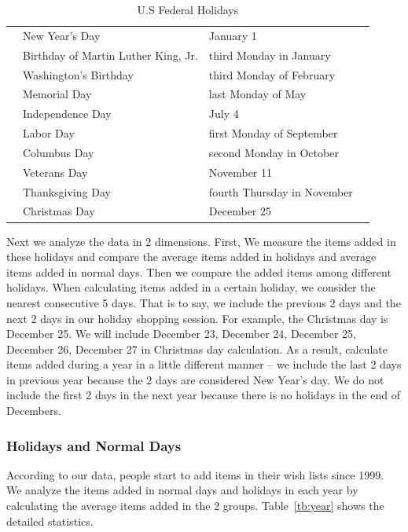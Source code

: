 \documentclass{llncs}
\begin{document}
\begin{table}[!ht]
\centering
\caption{U.S Federal Holidays}
\label{tb:holiday}
\begin{tabular}{p{2cm}p{6cm}p{6cm}p{2cm}}
& New Year's Day & January 1 & \\
& Birthday of Martin Luther King, Jr. & third Monday in January & \\
& Washington's Birthday & third Monday of February & \\
& Memorial Day & last Monday of May & \\
& Independence Day & July 4 & \\
& Labor Day & first Monday of September & \\
& Columbus Day & second Monday in October & \\
& Veterans Day & November 11 & \\
& Thanksgiving Day & fourth Thursday in November & \\
& Christmas Day & December 25 & \\
\end{tabular}
\end{table}

Next we analyze the data in 2 dimensions. First, We measure the items added in these holidays and compare the average items added in holidays and average items added in normal days. Then we compare the added items among different holidays. When calculating items added in a certain holiday, we consider the nearest consecutive 5 days. That is to say, we include the previous 2 days and the next 2 days in our holiday shopping session. For example, the Christmas day is December 25. We will include December 23, December 24, December 25, December 26, December 27 in Christmas day calculation. As a result, calculate items added during a year in a little different manner -- we include the last 2 days in previous year because the 2 days are considered New Year's day. We do not include the first 2 days in the next year because there is no holidays in the end of Decembers.


\subsubsection{Holidays and Normal Days}
According to our data, people start to add items in their wish lists since 1999. We analyze the items added in normal days and holidays in each year by calculating the average items added in the 2 groups. Table~\ref{tb:year} shows the detailed statistics.
\end{document}

